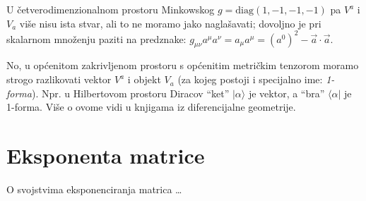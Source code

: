 U četverodimenzionalnom prostoru Minkowskog 
$g = \text{diag}(1, -1, -1, -1)$ pa $V^a$ i $V_a$ više nisu
ista stvar, ali to ne moramo jako naglašavati; dovoljno je
pri skalarnom množenju paziti na predznake:
$g_{\mu \nu} a^{\mu} a^{\nu} = a_{\mu} a^{\mu} = (a^{0})^2 
- \vec{a}\cdot\vec{a}$.

No, u općenitom zakrivljenom prostoru s općenitim metričkim
tenzorom moramo strogo razlikovati vektor $V^a$ i objekt
$V_a$ (za kojeg postoji i specijalno ime: \emph{1-forma}).
Npr. u Hilbertovom prostoru Diracov ``ket'' $|\alpha\rangle$ je
vektor, a ``bra'' $\langle\alpha|$ je 1-forma. Više o ovome
vidi u knjigama iz diferencijalne geometrije.

\chapter{Eksponenta matrice}
\label{sec:expmat}

O svojstvima eksponenciranja matrica \ldots

